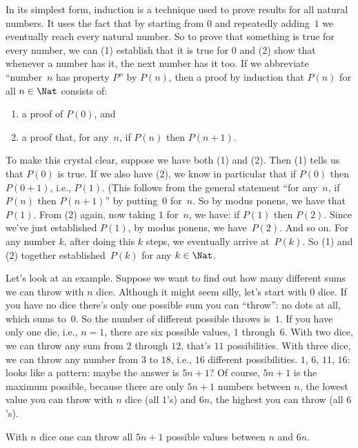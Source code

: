 \documentclass[../../../include/open-logic-section]{subfiles}
\begin{document}


In its simplest form, induction is a technique used to prove results
for all natural numbers. It uses the fact that by starting from $0$
and repeatedly adding~$1$ we eventually reach every natural number.  So
to prove that something is true for every number, we can (1) establish
that it is true for $0$ and (2) show that whenever a number has it,
the next number has it too.  If we abbreviate ``number~$n$ has
property $P$'' by $P(n)$, then a proof by induction that $P(n)$ for
all $n \in \Nat$ consists of:
\begin{enumerate}
\item a proof of $P(0)$, and
\item a proof that, for any~$n$, if $P(n)$ then $P(n+1)$.
\end{enumerate}
To make this crystal clear, suppose we have both (1) and (2).  Then
(1) tells us that $P(0)$ is true.  If we also have (2), we know in
particular that if $P(0)$ then $P(0+1)$, i.e., $P(1)$. (This follows
from the general statement ``for any~$n$, if $P(n)$ then $P(n+1)$'' by
putting~$0$ for~$n$.  So by modus ponens, we have that $P(1)$.  From
(2) again, now taking $1$ for~$n$, we have: if $P(1)$ then $P(2)$.
Since we've just established $P(1)$, by modus ponens, we
have~$P(2)$. And so on.  For any number $k$, after doing this $k$
steps, we eventually arrive at~$P(k)$.  So (1) and (2) together
established~$P(k)$ for any $k \in \Nat$.

Let's look at an example.  Suppose we want to find out how many
different sums we can throw with $n$ dice.  Although it might seem
silly, let's start with $0$ dice.  If you have no dice there's only one
possible sum you can ``throw'': no dots at all, which sums to~$0$. So
the number of different possible throws is~$1$. If you have only one
die, i.e., $n=1$, there are six possible values, $1$ through~$6$. With
two dice, we can throw any sum from $2$ through $12$, that's $11$
possibilities.  With three dice, we can throw any number from $3$ to
$18$, i.e., $16$ different possibilities.  $1$, $6$, $11$, $16$: looks
like a pattern: maybe the answer is $5n+1$?  Of course, $5n+1$ is the
maximum possible, because there are only $5n+1$ numbers between $n$,
the lowest value you can throw with $n$ dice (all $1$'s) and $6n$, the
highest you can throw (all $6$'s).

\begin{thm}
  With $n$ dice one can throw all $5n+1$ possible values between $n$
  and $6n$.
\end{thm}
\end{document}
